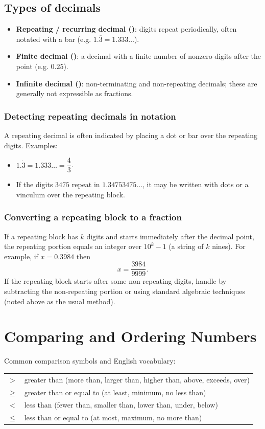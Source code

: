 \documentclass[12pt]{article}
\begin{document}
\subsection{Types of decimals}
\begin{itemize}
  \item \textbf{Repeating / recurring decimal ()}: digits repeat periodically, often notated with a bar (e.g. $1.\overline{3}=1.333\ldots$).
  \item \textbf{Finite decimal ()}: a decimal with a finite number of nonzero digits after the point (e.g. $0.25$).
  \item \textbf{Infinite decimal ()}: non-terminating and non-repeating decimals; these are generally not expressible as fractions.
\end{itemize}

\subsubsection{Detecting repeating decimals in notation}
A repeating decimal is often indicated by placing a dot or bar over the repeating digits. Examples:
\begin{itemize}
  \item $1.\dot{3} = 1.333\ldots = \dfrac{4}{3}$.
  \item If the digits $3475$ repeat in $1.34753475\ldots$, it may be written with dots or a vinculum over the repeating block.
\end{itemize}

\subsubsection{Converting a repeating block to a fraction}
If a repeating block has $k$ digits and starts immediately after the decimal point, the repeating portion equals an integer over $10^{k}-1$ (a string of $k$ nines). For example, if $x=0.\overline{3984}$ then
\[x=\dfrac{3984}{9999}.\]
If the repeating block starts after some non-repeating digits, handle by subtracting the non-repeating portion or using standard algebraic techniques (noted above as the usual method).

\section{Comparing and Ordering Numbers}
Common comparison symbols and English vocabulary:
\begin{center}
\begin{tabular}{@{}ll@{}}
$>$ & greater than (more than, larger than, higher than, above, exceeds, over) \\
$\ge$ & greater than or equal to (at least, minimum, no less than) \\
$<$ & less than (fewer than, smaller than, lower than, under, below) \\
$\le$ & less than or equal to (at most, maximum, no more than) \\
\end{tabular}
\end{center}
\end{document}
